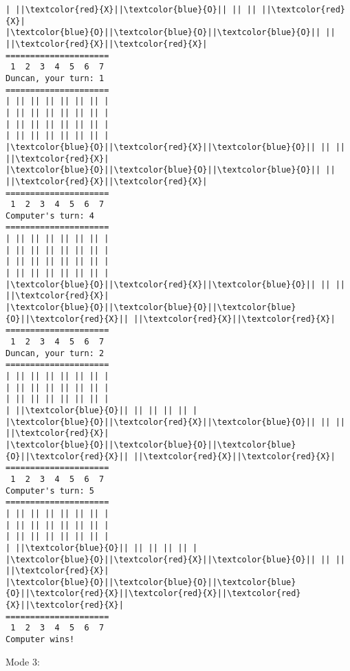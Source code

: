 \documentclass{article}
\begin{document}
\begin{Verbatim}[commandchars=\\\{\}]
| ||\textcolor{red}{X}||\textcolor{blue}{O}|| || || ||\textcolor{red}{X}|
|\textcolor{blue}{O}||\textcolor{blue}{O}||\textcolor{blue}{O}|| || ||\textcolor{red}{X}||\textcolor{red}{X}|
=====================
 1  2  3  4  5  6  7
Duncan, your turn: 1
=====================
| || || || || || || |
| || || || || || || |
| || || || || || || |
| || || || || || || |
|\textcolor{blue}{O}||\textcolor{red}{X}||\textcolor{blue}{O}|| || || ||\textcolor{red}{X}|
|\textcolor{blue}{O}||\textcolor{blue}{O}||\textcolor{blue}{O}|| || ||\textcolor{red}{X}||\textcolor{red}{X}|
=====================
 1  2  3  4  5  6  7
Computer's turn: 4
=====================
| || || || || || || |
| || || || || || || |
| || || || || || || |
| || || || || || || |
|\textcolor{blue}{O}||\textcolor{red}{X}||\textcolor{blue}{O}|| || || ||\textcolor{red}{X}|
|\textcolor{blue}{O}||\textcolor{blue}{O}||\textcolor{blue}{O}||\textcolor{red}{X}|| ||\textcolor{red}{X}||\textcolor{red}{X}|
=====================
 1  2  3  4  5  6  7
Duncan, your turn: 2
=====================
| || || || || || || |
| || || || || || || |
| || || || || || || |
| ||\textcolor{blue}{O}|| || || || || |
|\textcolor{blue}{O}||\textcolor{red}{X}||\textcolor{blue}{O}|| || || ||\textcolor{red}{X}|
|\textcolor{blue}{O}||\textcolor{blue}{O}||\textcolor{blue}{O}||\textcolor{red}{X}|| ||\textcolor{red}{X}||\textcolor{red}{X}|
=====================
 1  2  3  4  5  6  7
Computer's turn: 5
=====================
| || || || || || || |
| || || || || || || |
| || || || || || || |
| ||\textcolor{blue}{O}|| || || || || |
|\textcolor{blue}{O}||\textcolor{red}{X}||\textcolor{blue}{O}|| || || ||\textcolor{red}{X}|
|\textcolor{blue}{O}||\textcolor{blue}{O}||\textcolor{blue}{O}||\textcolor{red}{X}||\textcolor{red}{X}||\textcolor{red}{X}||\textcolor{red}{X}|
=====================
 1  2  3  4  5  6  7
Computer wins!
\end{Verbatim}
Mode 3:\\
\end{document}
